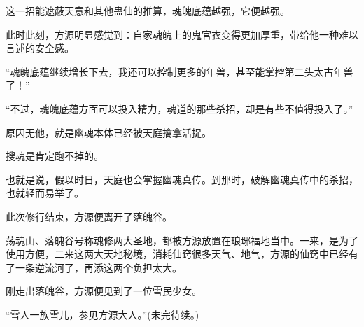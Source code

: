 \begin{this_body}
这一招能遮蔽天意和其他蛊仙的推算，魂魄底蕴越强，它便越强。

此时此刻，方源明显感觉到：自家魂魄上的鬼官衣变得更加厚重，带给他一种难以言述的安全感。

“魂魄底蕴继续增长下去，我还可以控制更多的年兽，甚至能掌控第二头太古年兽了！”

“不过，魂魄底蕴方面可以投入精力，魂道的那些杀招，却是有些不值得投入了。”

原因无他，就是幽魂本体已经被天庭擒拿活捉。

搜魂是肯定跑不掉的。

也就是说，假以时日，天庭也会掌握幽魂真传。到那时，破解幽魂真传中的杀招，也就轻而易举了。

此次修行结束，方源便离开了落魄谷。

荡魂山、落魄谷号称魂修两大圣地，都被方源放置在琅琊福地当中。一来，是为了使用方便，二来这两大天地秘境，消耗仙窍很多天气、地气，方源的仙窍中已经有了一条逆流河了，再添这两个负担太大。

刚走出落魄谷，方源便见到了一位雪民少女。

“雪人一族雪儿，参见方源大人。”(未完待续。)

\end{this_body}

